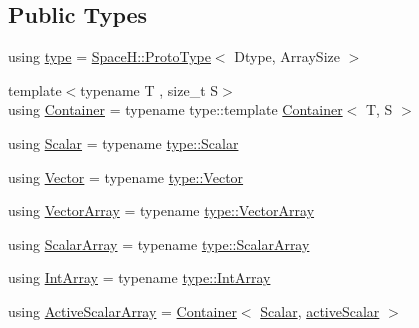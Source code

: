 \subsection*{Public Types}
\begin{DoxyCompactItemize}
\item 
using \mbox{\hyperlink{classparticles_a56e76813d460aa266e75dbe0f0ee67da}{type}} = \mbox{\hyperlink{struct_space_h_1_1_proto_type}{Space\+H\+::\+Proto\+Type}}$<$ Dtype, Array\+Size $>$
\item 
{\footnotesize template$<$typename T , size\+\_\+t S$>$ }\\using \mbox{\hyperlink{classparticles_a697aa55d257e7dea480460f042c91480}{Container}} = typename type\+::template \mbox{\hyperlink{classparticles_a697aa55d257e7dea480460f042c91480}{Container}}$<$ T, S $>$
\item 
using \mbox{\hyperlink{classparticles_a57a6b6582045a4b20742b99c513e9f63}{Scalar}} = typename \mbox{\hyperlink{struct_space_h_1_1_proto_type_af3c8245d83d9db64749882920de5c274}{type\+::\+Scalar}}
\item 
using \mbox{\hyperlink{classparticles_a1ef27d2f046db6514d79c8d7ee5c97d5}{Vector}} = typename \mbox{\hyperlink{struct_space_h_1_1_proto_type_a316b81f4660b2b4fab14a8e1f23b6089}{type\+::\+Vector}}
\item 
using \mbox{\hyperlink{classparticles_ac5dddc8c666e4f7057b5109f95926363}{Vector\+Array}} = typename \mbox{\hyperlink{struct_space_h_1_1_proto_type_a622b8e122b33bb4966a02299fb7b82d6}{type\+::\+Vector\+Array}}
\item 
using \mbox{\hyperlink{classparticles_ac88daa0d493d17c5ca2fe3a1d3fe4779}{Scalar\+Array}} = typename \mbox{\hyperlink{struct_space_h_1_1_proto_type_a09ef91dc8a37a044c403f5a833044725}{type\+::\+Scalar\+Array}}
\item 
using \mbox{\hyperlink{classparticles_a1b766bf5ccced2005beaacbb07e46bf9}{Int\+Array}} = typename \mbox{\hyperlink{struct_space_h_1_1_proto_type_ad9105b93d029a9d231bc31ddcfd7dbd9}{type\+::\+Int\+Array}}
\item 
using \mbox{\hyperlink{classparticles_a1a7d26adb64aacc4201e6bbb9de64c47}{Active\+Scalar\+Array}} = \mbox{\hyperlink{classparticles_a697aa55d257e7dea480460f042c91480}{Container}}$<$ \mbox{\hyperlink{classparticles_a57a6b6582045a4b20742b99c513e9f63}{Scalar}}, \mbox{\hyperlink{classparticles_ae1bbd3d94802cc0b3dc84b473a0115ab}{active\+Scalar}} $>$
\end{DoxyCompactItemize}
